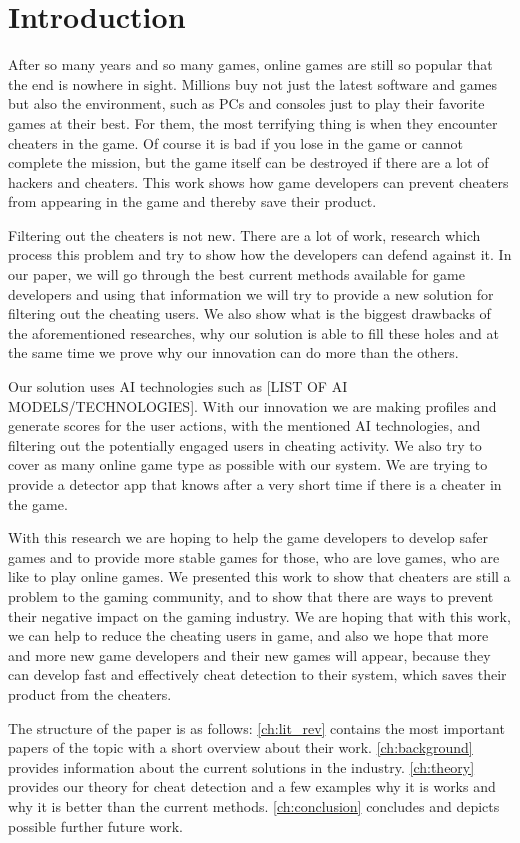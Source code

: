 \chapter{Introduction}
\label{ch:intro}

After so many years and so many games, online games are still so popular that the end is nowhere in sight.
Millions buy not just the latest software and games but also the environment, such as PCs and consoles just to play their favorite games at their best.
For them, the most terrifying thing is when they encounter cheaters in the game.
Of course it is bad if you lose in the game or cannot complete the mission, but the game itself can be destroyed if there are a lot of hackers and cheaters.
This work shows how game developers can prevent cheaters from appearing in the game and thereby save their product.

Filtering out the cheaters is not new. 
There are a lot of work, research which process this problem and try to show how the developers can defend against it.
In our paper, we will go through the best current methods available for game developers and using that information we will try to provide a new solution for filtering out the cheating users.
We also show what is the biggest drawbacks of the aforementioned researches, why our solution is able to fill these holes and at the same time we prove why our innovation can do more than the others.

Our solution uses AI technologies such as [LIST OF AI MODELS/TECHNOLOGIES].
With our innovation we are making profiles and generate scores for the user actions, with the mentioned AI technologies, and filtering out the potentially engaged users in cheating activity. 
We also try to cover as many online game type as possible with our system. We are trying to provide a detector app that knows after a very short time if there is a cheater in the game.

With this research we are hoping to help the game developers to develop safer games and to provide more stable games for those, who are love games, who are like to play online games.
We presented this work to show that cheaters are still a problem to the gaming community, and to show that there are ways to prevent their negative impact on the gaming industry.
We are hoping that with this work, we can help to reduce the cheating users in game, and also we hope that more and more new game developers and their new games will appear, because they can develop fast and effectively cheat detection to their system, which saves their product from the cheaters.

The structure of the paper is as follows: \autoref{ch:lit_rev} contains the most important papers of the topic with a short overview about their work.
\autoref{ch:background} provides information about the current solutions in the industry.
\autoref{ch:theory} provides our theory for cheat detection and a few examples why it is works and why it is better than the current methods.
\autoref{ch:conclusion} concludes and depicts possible further future work.